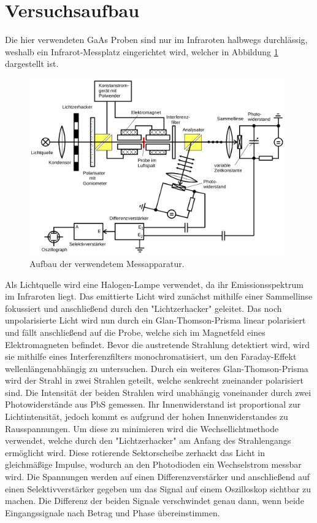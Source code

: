 
\section{Versuchsaufbau}

Die hier verwendeten GaAs Proben sind nur im Infraroten halbwegs durchlässig, weshalb ein
Infrarot-Messplatz eingerichtet wird, welcher in Abbildung \ref{fig:aufbau} dargestellt ist.

\begin{figure}[H]
  \centering
  \includegraphics[width=11cm]{Aufbau.png}
  \caption{Aufbau der verwendetem Messapparatur.}
  \label{fig:aufbau}
\end{figure}

Als Lichtquelle wird eine Halogen-Lampe verwendet, da ihr Emissionsspektrum im Infraroten liegt.
Das emittierte Licht wird zunächst mithilfe einer Sammellinse fokussiert und anschließend durch
den "Lichtzerhacker" geleitet. Das noch unpolarisierte Licht wird nun durch ein Glan-Thomson-Prisma
linear polarisiert und fällt anschließend auf die Probe, welche sich im Magnetfeld eines
Elektromagneten befindet.
Bevor die austretende Strahlung detektiert wird, wird sie mithilfe eines Interferenzfilters monochromatisiert,
um den Faraday-Effekt wellenlängenabhängig zu untersuchen. Durch ein weiteres Glan-Thomson-Prisma wird der
Strahl in zwei Strahlen geteilt, welche senkrecht zueinander polarisiert sind. Die Intensität der beiden
Strahlen wird unabhängig voneinander durch zwei Photowiderstände aus PbS gemessen. Ihr Innenwiderstand ist
proportional zur Lichtintensität, jedoch kommt es aufgrund der hohen Innenwiderstandes zu Rausspannungen.
Um diese zu minimieren wird die Wechsellichtmethode verwendet, welche durch den "Lichtzerhacker" am Anfang des
Strahlengangs ermöglicht wird. Diese rotierende Sektorscheibe zerhackt das Licht in gleichmäßige Impulse, wodurch
an den Photodioden ein Wechselstrom messbar wird. Die Spannungen werden auf einen Differenzverstärker und anschließend auf
einen Selektivverstärker gegeben um das Signal auf einem Oszilloskop sichtbar zu machen.
Die Differenz der beiden Signale verschwindet genau dann, wenn beide Eingangssignale nach Betrag und Phase
übereinstimmen.


